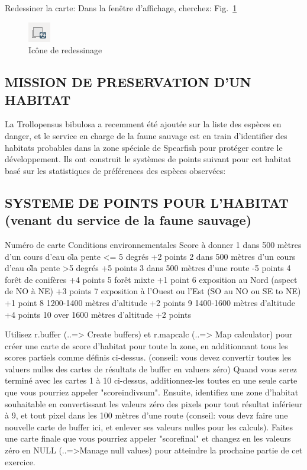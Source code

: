 Redessiner la carte:
Dans la fen\^etre d'affichage, cherchez:   Fig.~\ref{fig:grass020}

\begin{figure}[htbp]
   \centering
   \includegraphics[scale=1]{grass020.png}
   \caption{Ic\^one de redessinage}
   \label{fig:grass020}
\end{figure}

\subsection{MISSION DE PRESERVATION D'UN HABITAT}
La Trollopensus bibulosa a recemment \'et\'e ajout\'ee sur la liste des esp\`eces en danger, et le service en charge de la faune sauvage est en train d'identifier des habitats probables dans la zone sp\'eciale de Spearfish pour prot\'eger contre le d\'eveloppement. Ils ont construit le syst\`emes de points suivant pour cet habitat bas\'e sur les statistiques de pr\'ef\'erences des esp\`eces observ\'ees:

\subsection{SYSTEME DE POINTS POUR L'HABITAT (venant du service de la faune sauvage) }

Num\'ero de carte Conditions environnementales Score \`a donner
1 dans 500 m\`etres d'un cours d'eau o\` la pente <= 5 degr\'es +2 points
2 dans 500 m\`etres d'un cours d'eau o\` la pente >5 degr\'es +5 points
3 dans 500 m\`etres d'une route -5 points
4 for\^et de conif\`eres +4 points
5 for\^et mixte +1 point
6 exposition au Nord (aspect de NO \`a NE) +3 points
7 exposition \`a l'Ouest ou l'Est (SO au NO ou SE to NE) +1 point
8 1200-1400 m\`etres d'altitude +2 points
9 1400-1600 m\`etres d'altitude +4 points
10 over 1600 m\`etres d'altitude +2 points

Utilisez r.buffer (..=> Create buffers) et r.mapcalc (..=> Map calculator) pour cr\'eer une carte de score d'habitat pour toute la zone, en additionnant tous les scores partiels comme d\'efinis ci-dessus. (conseil: vous devez convertir toutes les valuers nulles des cartes de r\'esultats de buffer en valuers z\'ero)
Quand vous serez termin\'e avec les cartes 1 \`a 10 ci-dessus, additionnez-les toutes en une seule carte que vous pourriez appeler "scoreindivsum". Ensuite, identifiez une zone d'habitat souhaitable en convertissant les valeurs z\'ero des pixels pour tout r\'esultat inf\'erieur \`a 9, et tout pixel dans les 100 m\`etres d'une route (conseil: vous devz faire une nouvelle carte de buffer ici, et enlever ses valeurs nulles pour les calculs). Faites une carte finale que vous pourriez appeler "scorefinal" et changez en les valeurs z\'ero en NULL (..=>Manage null values) pour atteindre la prochaine partie de cet exercice.

